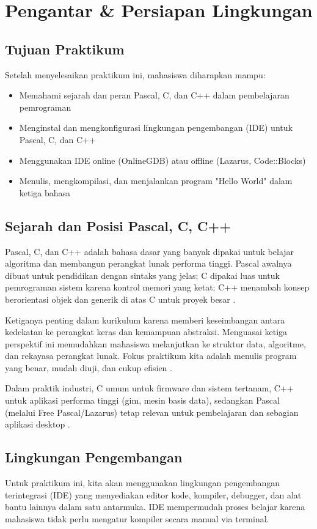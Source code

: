 \documentclass[../main.tex]{subfiles}
\begin{document}
\chapter{Pengantar \& Persiapan Lingkungan}

\section*{Tujuan Praktikum}
Setelah menyelesaikan praktikum ini, mahasiswa diharapkan mampu:
\begin{itemize}
  \item Memahami sejarah dan peran Pascal, C, dan C++ dalam pembelajaran pemrograman
  \item Menginstal dan mengkonfigurasi lingkungan pengembangan (IDE) untuk Pascal, C, dan C++
  \item Menggunakan IDE online (OnlineGDB) atau offline (Lazarus, Code::Blocks)
  \item Menulis, mengkompilasi, dan menjalankan program "Hello World" dalam ketiga bahasa
\end{itemize}

\section{Sejarah dan Posisi Pascal, C, C++}
Pascal, C, dan C++ adalah bahasa dasar yang banyak dipakai untuk belajar algoritma dan membangun perangkat lunak performa tinggi. Pascal awalnya dibuat untuk pendidikan dengan sintaks yang jelas; C dipakai luas untuk pemrograman sistem karena kontrol memori yang ketat; C++ menambah konsep berorientasi objek dan generik di atas C untuk proyek besar \parencite{pascal-tutorial-wikibooks,gnu-c-manual,cpp-reference}.

Ketiganya penting dalam kurikulum karena memberi keseimbangan antara kedekatan ke perangkat keras dan kemampuan abstraksi. Menguasai ketiga perspektif ini memudahkan mahasiswa melanjutkan ke struktur data, algoritme, dan rekayasa perangkat lunak. Fokus praktikum kita adalah menulis program yang benar, mudah diuji, dan cukup efisien \parencite{free-pascal-docs,gnu-c-manual,cpp-reference}.

Dalam praktik industri, C umum untuk firmware dan sistem tertanam, C++ untuk aplikasi performa tinggi (gim, mesin basis data), sedangkan Pascal (melalui Free Pascal/Lazarus) tetap relevan untuk pembelajaran dan sebagian aplikasi desktop \parencite{free-pascal-docs}.

\section{Lingkungan Pengembangan}
Untuk praktikum ini, kita akan menggunakan lingkungan pengembangan terintegrasi (IDE) yang menyediakan editor kode, kompiler, debugger, dan alat bantu lainnya dalam satu antarmuka. IDE mempermudah proses belajar karena mahasiswa tidak perlu mengatur kompiler secara manual via terminal.
\end{document}
